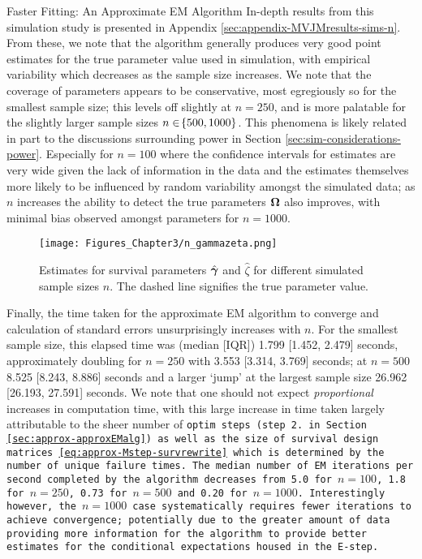 \begin{chapter}{\label{cha:approx}Faster Fitting: An Approximate EM Algorithm}
  In-depth results from this simulation study is presented in Appendix \ref{sec:appendix-MVJMresults-sims-n}. From these, we note that the algorithm generally produces very good point estimates for the true parameter value used in simulation, with empirical variability which decreases as the sample size increases. We note that the coverage of parameters appears to be conservative, most egregiously so for the smallest sample size; this levels off slightly at $n=250$, and is more palatable for the slightly larger sample sizes $n\in\!\left\{500,1000\right\}$. This phenomena is likely related in part to the discussions surrounding power in Section \ref{sec:sim-considerations-power}. Especially for $n=100$ where the confidence intervals for estimates are very wide given the lack of information in the data and the estimates themselves more likely to be influenced by random variability amongst the simulated data; as $n$ increases the ability to detect the true parameters $\bm{\mathrm{\Omega}}$ also improves, with minimal bias observed amongst parameters for $n=1000$.

  \begin{figure}[t]
      \centering
      \texttt{[image: Figures\_Chapter3/n\_gammazeta.png]}
      \caption{Estimates for survival parameters $\hat{\bm{\gamma}}$ and $\hat{\zeta}$ for different simulated sample sizes $n$. The dashed line signifies the true parameter value.}
      \label{fig:approx-sims-n}
  \end{figure}

  Finally, the time taken for the approximate EM algorithm to converge and calculation of standard errors unsurprisingly increases with $n$. For the smallest sample size, this elapsed time was (median [IQR]) 1.799 [1.452, 2.479] seconds, approximately doubling for $n=250$ with 3.553 [3.314, 3.769] seconds; at $n=500$ 8.525 [8.243, 8.886] seconds and a larger `jump' at the largest sample size 26.962 [26.193, 27.591] seconds. We note that one should not expect \textit{proportional} increases in computation time, with this large increase in time taken largely attributable to the sheer number of \tt{optim} steps (\ie step 2. in Section \ref{sec:approx-approxEMalg}) as well as the size of survival design matrices \eqref{eq:approx-Mstep-survrewrite} which is determined by the number of unique failure times. The median number of EM iterations per second completed by the algorithm decreases from 5.0 for $n=100$, 1.8 for $n=250$, 0.73 for $n=500$ and 0.20 for $n=1000$. Interestingly however, the $n=1000$ case systematically requires fewer iterations to achieve convergence; potentially due to the greater amount of data providing more information for the algorithm to provide better estimates for the conditional expectations housed in the E-step.
  

\end{chapter}
